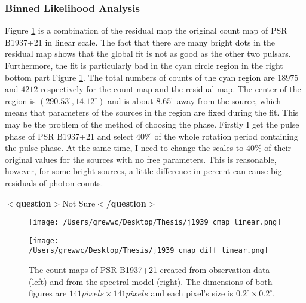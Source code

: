 \documentclass[12pt]{report}
\newcommand{\question}[1]{
  $<$\textbf{question}$>$#1$<$\textbf{/question}$>$
}
\begin{document}
        \subsubsection{Binned Likelihood Analysis}
          Figure \ref{fig: j1939_count_map_diff} is a combination of the residual map the 
          original count map of PSR B1937+21 in linear scale. The fact that there are many 
          bright dots in the residual map shows that the global fit is not as good as the 
          other two pulsars. Furthermore, the fit is particularly bad in the cyan circle 
          region in the right bottom part Figure \ref{fig: j1939_count_map_diff}. 
          The total numbers of counts of the cyan region are $18975$ and $4212$ respectively 
          for the count map and the residual map. The center of the region is 
          $\left(290.53^{\circ}, 14.12^{\circ}\right)$ and is about $8.65^{\circ}$ away from 
          the source, which means that parameters of the sources in the region are fixed 
          during the fit. This may be the problem of the method of choosing the phase. 
          Firstly I get the pulse phase of PSR B1937+21 and select $40\%$ of the whole 
          rotation period containing the pulse phase. At the same time, I need to change the 
          scales to $40\%$ of their original values for the sources with no free 
          parameters. This is reasonable, however, for some bright sources, a little 
          difference in percent can cause big residuals of photon counts. 
          \question{Not Sure}

          \begin{figure}[!ht]
            \begin{center}
            \begin{minipage}{0.45\textwidth}
              \begin{center} 
                \texttt{[image: /Users/grewwc/Desktop/Thesis/j1939\_cmap\_linear.png]}
              \end{center}
            \end{minipage}
            \begin{minipage}{0.45\textwidth}
              \begin{center}
                \texttt{[image: /Users/grewwc/Desktop/Thesis/j1939\_cmap\_diff\_linear.png]}
              \end{center}
            \end{minipage}
            \end{center}

            \caption{The count maps of PSR B1937+21 created from observation 
              data (\textsf{left}) and from the spectral model (\textsf{right}). The dimensions
              of both figures are $141 pixels \times 141 pixels$ and each pixel's size is
              $0.2^{\circ}\times0.2^{\circ}$.}
            \label{fig: j1939_count_map_diff}
          \end{figure}
\end{document}

